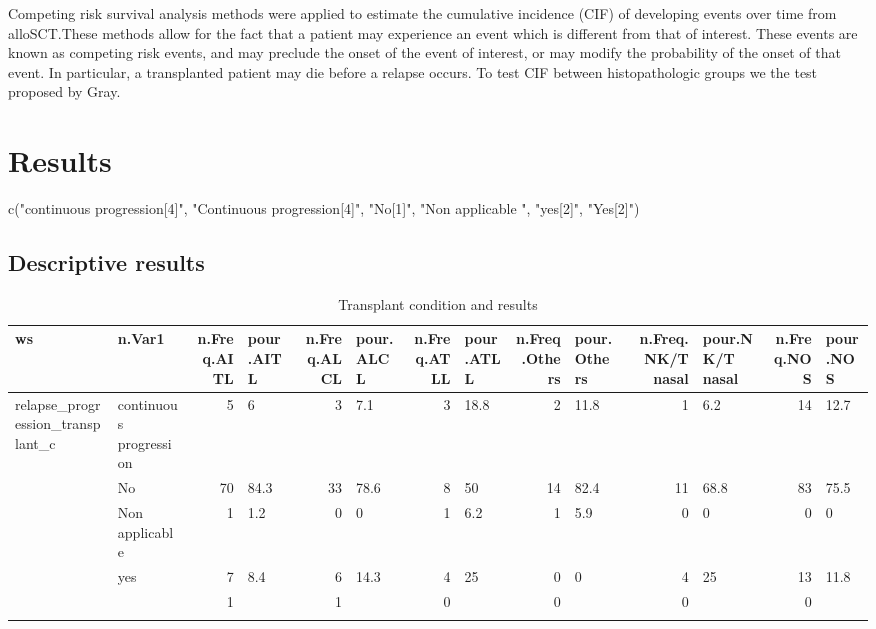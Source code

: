 \documentclass[a4paper,11pt] {article}
\begin{document}
Competing risk survival analysis methods were applied to estimate the cumulative incidence (CIF) of developing events over time from alloSCT.These methods allow for the fact that a patient may experience an event which is different from that of interest. These events are known as competing risk events, and may preclude the onset of the event of interest, or may modify the probability of the onset of that event. In particular, a transplanted patient may die before a relapse occurs.
To test CIF between histopathologic groups we the test proposed by Gray. 

\pagebreak[4]
\section{Results}



c("continuous progression[4]", "Continuous progression[4]", "No[1]", 
"Non applicable ", "yes[2]", "Yes[2]")
\subsection{Descriptive results }
\begin{longtable}{llrlrlrlrlrlrl}
  \hline
ws & n.Var1 & n.Freq.AITL & pour.AITL & n.Freq.ALCL & pour.ALCL & n.Freq.ATLL & pour.ATLL & n.Freq.Others & pour.Others & n.Freq.NK/T nasal & pour.NK/T nasal & n.Freq.NOS & pour.NOS \\ 
  \hline
relapse_progression_transplant_c & continuous progression &   5 & 6 &   3 & 7.1 &   3 & 18.8 &   2 & 11.8 &   1 & 6.2 &  14 & 12.7 \\ 
   & No &  70 & 84.3 &  33 & 78.6 &   8 & 50 &  14 & 82.4 &  11 & 68.8 &  83 & 75.5 \\ 
   & Non applicable  &   1 & 1.2 &   0 & 0 &   1 & 6.2 &   1 & 5.9 &   0 & 0 &   0 & 0 \\ 
   & yes &   7 & 8.4 &   6 & 14.3 &   4 & 25 &   0 & 0 &   4 & 25 &  13 & 11.8 \\ 
   &  &   1 &  &   1 &  &   0 &  &   0 &  &   0 &  &   0 &  \\ 
   \hline
\hline
\caption{Transplant condition and results} 
\label{tab:condi}
\end{longtable}
\end{document}
